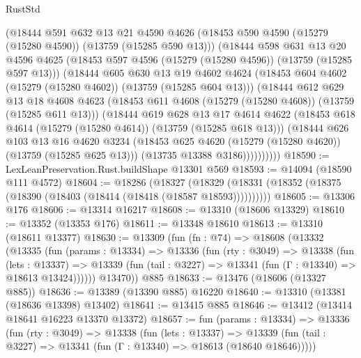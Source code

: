 \begin{lexlean}{RustStd}
\begin{coremodule}
          (@18444
            @591
            @632
            @13
            @21
            @4590
            @4626
            (@18453 @590 @4590 (@15279 (@15280 @4590)) (@13759 (@15285 @590 @13)))
            (@18444
              @598
              @631
              @13
              @20
              @4596
              @4625
              (@18453 @597 @4596 (@15279 (@15280 @4596)) (@13759 (@15285 @597 @13)))
              (@18444
                @605
                @630
                @13
                @19
                @4602
                @4624
                (@18453 @604 @4602 (@15279 (@15280 @4602)) (@13759 (@15285 @604 @13)))
                (@18444
                  @612
                  @629
                  @13
                  @18
                  @4608
                  @4623
                  (@18453 @611 @4608 (@15279 (@15280 @4608)) (@13759 (@15285 @611 @13)))
                  (@18444
                    @619
                    @628
                    @13
                    @17
                    @4614
                    @4622
                    (@18453 @618 @4614 (@15279 (@15280 @4614)) (@13759 (@15285 @618 @13)))
                    (@18444
                      @626
                      @103
                      @13
                      @16
                      @4620
                      @3234
                      (@18453 @625 @4620 (@15279 (@15280 @4620)) (@13759 (@15285 @625 @13)))
                      (@13735 @13388 @3186))))))))))
@18590 := LexLeanPreservation.Rust.buildShape @13301 @569
@18593 := @14094 (@18590 @111 @4572)
@18604 := @18286
    (@18327 (@18329 (@18331 (@18352 (@18375 (@18390 (@18403 (@18414 (@18418 (@18587 @18593))))))))))
@18605 := @13306 @176
@18606 := @13314 @16217
@18608 := @13310 (@18606 @13329)
@18610 := @13352 (@13353 @176)
@18611 := @13348 @18610
@18613 := @13310 (@18611 @13377)
@18630 := @13309
    (fun (fn : @74) =>
    @18608
      (@13332
        (@13335
          (fun (params : @13334) =>
          @13336
            (fun (rty : @3049) =>
            @13338
              (fun (lets : @13337) =>
              @13339 (fun (tail : @3227) => @13341 (fun (Γ : @13340) => @18613 @13424))))))
        @13470))
    @885
@18633 := @13476 (@18606 (@13327 @885))
@18636 := @13389 (@13390 @885) @16220
@18640 := @13310 (@13381 (@18636 @13398) @13402)
@18641 := @13415 @885
@18646 := @13412 (@13414 @18641 @16223 @13370 @13372)
@18657 := fun (params : @13334) =>
  @13336
    (fun (rty : @3049) =>
    @13338
      (fun (lets : @13337) =>
      @13339 (fun (tail : @3227) => @13341 (fun (Γ : @13340) => @18613 (@18640 @18646)))))

\end{coremodule}
\end{lexlean}
